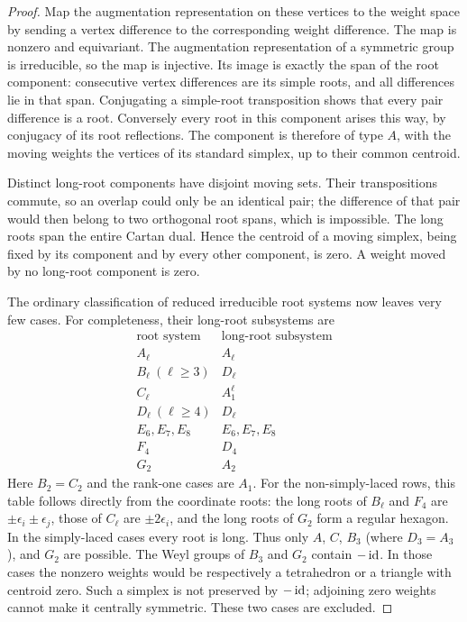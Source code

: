\begin{proof}
Map the augmentation representation on these vertices to the
weight space by sending a vertex difference to the corresponding
weight difference.  The map is nonzero and equivariant.  The
augmentation representation of a symmetric group is irreducible,
so the map is injective.  Its image is exactly the span of the
root component: consecutive vertex differences are its simple
roots, and all differences lie in that span.  Conjugating a
simple-root transposition shows that every pair difference is a
root.  Conversely every root in this component arises this way,
by conjugacy of its root reflections.  The component is
therefore of type $A$, with the moving weights the vertices of
its standard simplex, up to their common centroid.

Distinct long-root components have disjoint moving sets.
Their transpositions commute, so an overlap could only be an
identical pair; the difference of that pair would then belong to
two orthogonal root spans, which is impossible.  The long roots
span the entire Cartan dual.  Hence the centroid of a moving
simplex, being fixed by its component and by every other
component, is zero.  A weight moved by no long-root component is
zero.

The ordinary classification of reduced irreducible root systems
\cite[Theorem 3.10]{Cap2016} now leaves very few cases.
For completeness, their long-root
subsystems are
\[
\begin{array}{c|c}
 \text{root system}&\text{long-root subsystem}\\ \hline
 A_\ell&A_\ell\\
 B_\ell\ (\ell\ge3)&D_\ell\\
 C_\ell&A_1^{\ell}\\
 D_\ell\ (\ell\ge4)&D_\ell\\
 E_6,E_7,E_8&E_6,E_7,E_8\\
 F_4&D_4\\
 G_2&A_2
\end{array}
\]
Here $B_2=C_2$ and the rank-one cases are $A_1$.
For the non-simply-laced rows, this table follows directly from
the coordinate roots: the long roots of $B_\ell$ and $F_4$ are
$\pm\epsilon_i\pm\epsilon_j$, those of $C_\ell$ are
$\pm2\epsilon_i$, and the long roots of $G_2$ form a regular
hexagon.  In the simply-laced cases every root is long.
Thus only $A$, $C$, $B_3$ (where $D_3=A_3$), and $G_2$
are possible.  The Weyl groups of $B_3$ and $G_2$ contain
$-\operatorname{id}$.  In those cases the nonzero weights would be respectively
a tetrahedron or a triangle with centroid zero.  Such a simplex
is not preserved by $-\operatorname{id}$; adjoining zero weights cannot make
it centrally symmetric.  These two cases are excluded.


\end{proof}
